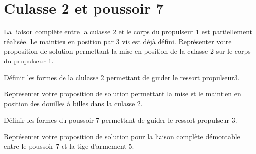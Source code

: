 \documentclass[11pt]{article}
\begin{document}
\section{Culasse 2 et poussoir 7}

\UPSTIquestion* La liaison complète entre la culasse 2 et le corps du propulseur 1 est partiellement réalisée. Le maintien en position par 3 vis est déjà défini. Représenter votre proposition de solution permettant la mise en position de la culasse 2 sur le corps du propulseur 1. 
\begin{UPSTIcorrige}
\end{UPSTIcorrige}

\UPSTIquestion Définir les formes de la clulasse 2 permettant de guider le ressort propulseur3.
\begin{UPSTIcorrige}
\end{UPSTIcorrige}

\UPSTIquestion Représenter votre proposition de solution permettant la mise et le maintien en position des douilles à billes dans la culasse 2. 
\begin{UPSTIcorrige}
\end{UPSTIcorrige}

\UPSTIquestion Définir les formes du poussoir 7 permettant de guider le ressort propulseur 3.

 Représenter votre proposition de solution pour la liaison complète démontable entre le poussoir 7 et la tige d'armement 5. 
\begin{UPSTIcorrige}
\end{UPSTIcorrige}


\end{document}
